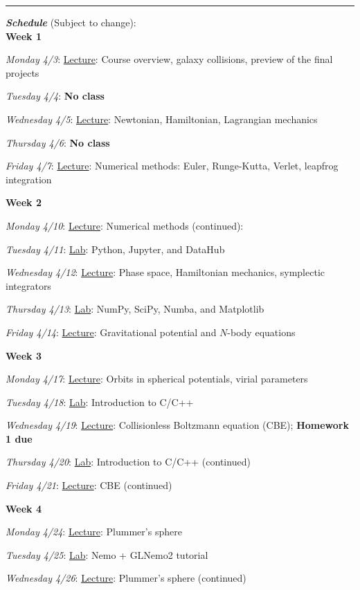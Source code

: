 \documentclass[12pt]{article}
\begin{document}
\begin{center}
  \rule{\textwidth}{0.5pt}
\end{center}

\noindent\textbf{\emph{Schedule}} (Subject to change):\\

\noindent\textbf{Week 1}

\emph{Monday 4/3}: \underline{Lecture}: Course overview, galaxy collisions, preview of the final projects

\emph{Tuesday 4/4}: \textbf{No class}

\emph{Wednesday 4/5}: \underline{Lecture}: Newtonian, Hamiltonian, Lagrangian mechanics

\emph{Thursday 4/6}: \textbf{No class}

\emph{Friday 4/7}: \underline{Lecture}: Numerical methods: Euler, Runge-Kutta, Verlet, leapfrog integration

\noindent\textbf{Week 2}

\emph{Monday 4/10}: \underline{Lecture}: Numerical methods (continued): 

\emph{Tuesday 4/11}: \underline{Lab}: Python, Jupyter, and DataHub

\emph{Wednesday 4/12}: \underline{Lecture}: Phase space, Hamiltonian mechanics, symplectic integrators

\emph{Thursday 4/13}: \underline{Lab}: NumPy, SciPy, Numba, and Matplotlib

\emph{Friday 4/14}: \underline{Lecture}: Gravitational potential and $N$-body equations

\noindent\textbf{Week 3}

\emph{Monday 4/17}: \underline{Lecture}: Orbits in spherical potentials, virial parameters

\emph{Tuesday 4/18}: \underline{Lab}: Introduction to C/C++

\emph{Wednesday 4/19}: \underline{Lecture}: Collisionless Boltzmann equation (CBE); \textbf{Homework 1 due}

\emph{Thursday 4/20}: \underline{Lab}: Introduction to C/C++ (continued)

\emph{Friday 4/21}: \underline{Lecture}: CBE (continued)

\noindent\textbf{Week 4}

\emph{Monday 4/24}: \underline{Lecture}: Plummer's sphere

\emph{Tuesday 4/25}: \underline{Lab}: Nemo + GLNemo2 tutorial

\emph{Wednesday 4/26}: \underline{Lecture}: Plummer's sphere (continued)
\end{document}
